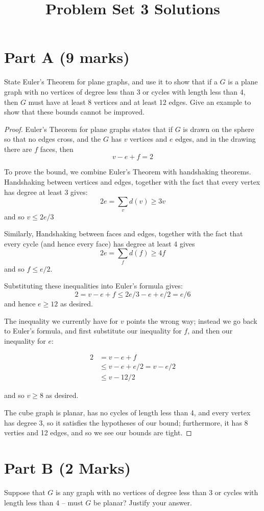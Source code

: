 \documentclass{amsart}
\title{Problem Set 3 Solutions}
\begin{document}
\maketitle

\section*{Part A (9 marks)} 
State Euler's Theorem for plane graphs, and use it to show that if a $G$ is a plane graph with no vertices of degree less than 3 or cycles with length less than 4, then $G$ must have at least 8 vertices and at least 12 edges.  Give an example to show that these bounds cannot be improved.

\begin{proof}
  Euler's Theorem for plane graphs states that if $G$ is drawn on the sphere so that no edges cross, and the $G$ has $v$ vertices and $e$ edges, and in the drawing there are $f$ faces, then
  $$v-e+f=2$$

To prove the bound, we combine Euler's Theorem with handshaking theorems.
Handshaking between vertices and edges, together with the fact that every vertex has degree at least 3 gives:
$$2e=\sum_{v} d(v)\geq 3v$$
and so $v\leq 2e/3$

Similarly, Handshaking between faces and edges, together with the fact that every cycle (and hence every face) has degree at least 4 gives
$$2e=\sum_{f} d(f)\geq 4f$$
and so $f\leq e/2$.

Substituting these inequalities into Euler's formula gives:
$$2=v-e+f\leq 2e/3-e+e/2=e/6$$
and hence $e\geq 12$ as desired.

The inequality we currently have for $v$ points the wrong way; instead we go back to Euler's formula, and first substitute our inequality for $f$, and then our inequality for $e$:

\begin{align*}
  2&=v-e+f \\
  &\leq v-e+e/2 =v-e/2\\
  &\leq v-12/2
\end{align*}

and so $v\geq 8$ as desired.

The cube graph is planar, has no cycles of length less than 4, and every vertex has degree 3, so it satisfies the hypotheses of our bound; furthermore, it has 8 verties and 12 edges, and so we see our bounds are tight.
\end{proof}

\section*{Part B (2 Marks)}
Suppose that $G$ is any graph with no vertices of degree less than 3 or cycles with length less than 4 -- must $G$ be planar?  Justify your answer.
\end{document}
